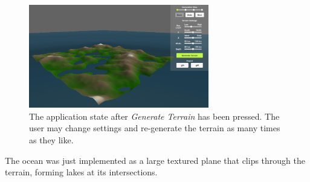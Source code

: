 \begin{figure}[H]
  \centering

  \includegraphics[width=0.7\textwidth]{figure/terrain_generated.png}
  \caption{The application state after \textit{Generate Terrain} has been pressed. The user may change settings and re-generate the terrain as many times as they like.}

  \label{fig:terr}
\end{figure}

The ocean was just implemented as a large textured plane that clips through the terrain, forming lakes at its intersections.

